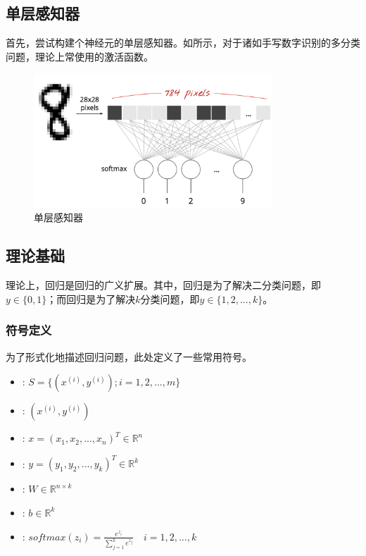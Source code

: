 \begin{content}
\section{单层感知器}

\begin{content}

首先，尝试构建个神经元的单层感知器。如所示，对于诸如手写数字识别的多分类问题，理论上常使用的激活函数。

\begin{figure}[H]
\centering
\includegraphics[width=0.8\textwidth]{figures/mnist-slp.png}
\caption{单层感知器}
 \label{fig:mnist-slp}
\end{figure}

\subsection{理论基础}

理论上，回归是回归的广义扩展。其中，回归是为了解决二分类问题，即$y \in \{ 0,1\}$；而回归是为了解决$ k $分类问题，即$y \in \{ 1,2,...,k\}$。

\subsubsection{符号定义}

为了形式化地描述回归问题，此处定义了一些常用符号。

 \begin{itemize}
   \item {}: $ S = \{ ({x^{(i)}},{y^{(i)}});i = 1,2,...,m\} $
   \item {}: $ ({x^{(i)}},{y^{(i)}}) $
   \item {}: $ x = ({x_1},{x_2},...,{x_n})^{T}  \in {\mathbb{R}^n} $
   \item {}: $ y = ({y_1},{y_2},...,{y_k})^{T} \in {\mathbb{R}^k} $
   \item {}: $ W \in {\mathbb{R}^{n \times k}} $   
   \item {}: $ b \in {\mathbb{R}^k} $   
   \item {}: $ 
softmax {(z_i)} = \tfrac{{{e^{{z_i}}}}}{{\sum\limits_{j = 1}^k {{e^{{z_j}}}} }}  \quad i = 1,2,...,k
$
 \end{itemize}


\end{content}
\end{content}
